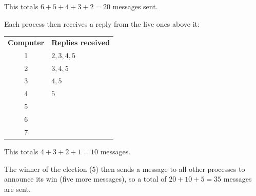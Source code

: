 This totals $6 + 5 + 4 + 3 + 2 = 20$ messages sent.

Each process then receives a reply from the live ones above it:

\begin{center}
  \begin{tabular}{cl}
    \textbf{Computer} & \textbf{Replies received}\\
      1 & $2,3,4,5$\\
      2 & $3,4,5$\\
      3 & $4,5$\\
      4 & $5$\\
      5 & \\
      6 & \\
      7 & \\
  \end{tabular}
\end{center}

This totals $4 + 3 + 2 + 1 = 10$ messages.

The winner of the election ($5$) then sends a message to all other processes to
announce its win (five more messages), so a total of $20 + 10 + 5 = 35$ messages
are sent.
